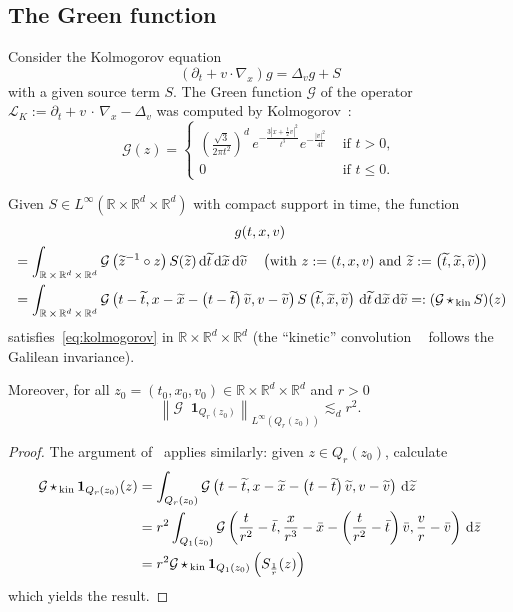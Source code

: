 \documentclass[10pt]{amsart}
\theoremstyle{definition}\newtheorem{defi}[theo]{Definition}\newtheorem{rema}[theo]{Remark}\newtheorem{exam}[theo]{Example}\newtheorem{exem}[theo]{Example}\newtheorem{nota}[theo]{Notation}
\DeclareMathOperator{\starkin}{\star_{\, kin}}
\newcommand{\R}{\mathbb{R}}
\newcommand{\cL}{\mathcal{L}}
\newcommand{\cG}{\mathcal{G}}
\newcommand*\un{\mathbf{1}}
\newcommand{\dd}{{\, \mathrm d}}
\let\oldtilde\tilde
\renewcommand*{\tilde}[1]{\mathchoice{\widetilde{#1}}{\widetilde{#1}}{\oldtilde{#1}}{\oldtilde{#1}}}
\begin{document}
\subsection{The Green function}

Consider the Kolmogorov equation
\begin{equation}\label{eq:kolmogorov}
(\partial_t + v \cdot \nabla_x) g = \Delta_v g + S
\end{equation}
with a given source term $S$. The Green function $\cG$ of the operator $\cL_K:= \partial_t + v\,\cdot\,\nabla_x - \Delta_v$ was computed by Kolmogorov~\cite{kolm}:
\begin{equation}\label{eq:green}
\cG(z) =
\begin{cases}
\left(\frac{\sqrt{3}}{2 \pi t^2}\right)^d\,e^{-\frac{3\left|x+\frac{t}2 v\right|^2}{t^3}} e^{-\frac{|v|^2}{4 t}} & \text{ if } t > 0, \\
0 & \text{ if } t \le 0.
\end{cases}
\end{equation}

\begin{prop}\label{prop:pregreen}
Given $S \in L^\infty(\R \times \R^d \times \R^d)$ with compact support in time, the function
\begin{multline*}
g(t,x,v) \\
\begin{aligned}
&= \int_{\R\,\times\,\R^d\,\times\,\R^d}
\cG\left(\tilde z^{-1} \circ z\right) S(\tilde z) \dd \tilde t \dd
\tilde x \dd \tilde v \quad
 \left(\text{with } z:=(t,x,v) \text{ and } \tilde z := \left(\tilde t,\tilde x,\tilde v\right)\right)\\
& = \int_{\R\,\times\,\R^d\,\times\,\R^d} \cG\left(t-\tilde t,x- \tilde x - \left(t - \tilde t\right)\tilde v,v-\tilde v\right) S \left(\tilde t,\tilde x,\tilde v\right) \dd \tilde t \dd \tilde x \dd \tilde v =: (\cG \starkin S)(z)
\end{aligned}
\end{multline*}
satisfies~\eqref{eq:kolmogorov} in $\R \times \R^d \times \R^d$ (the ``kinetic'' convolution $\starkin$ follows the Galilean invariance).

Moreover, for all $z_0 =(t_0,x_0,v_0) \in \R \times \R^d \times \R^d$ and $r >0$
\[
\left\|\cG \starkin \un_{Q_r(z_0)}\right\|_{L^\infty\left(Q_r(z_0)\right)}
\lesssim_d r^2.
\]
\end{prop}

\begin{proof}
The argument of~\cite[Lemma~8.4.1, p.~115]{krylov1996} applies similarly: given $z \in Q_r(z_0)$, calculate
\begin{align*}
\cG \starkin \un_{Q_r(z_0)}(z) & = \int_{Q_r(z_0)} \cG\left(t-\tilde t,x- \tilde x - \left(t - \tilde t\right)\tilde v,v-\tilde v\right) \dd \tilde z \\
& = r^2 \int_{Q_1(z_0)} \cG\left(\frac{t}{r^2}-\bar t,\frac{x}{r^3}- \bar x - \left(\frac{t}{r^2} - \bar t\right)\bar v,\frac{v}{r}-\bar v\right) \dd \bar z \\
& = r^2 \cG \starkin \un_{Q_1(z_0)}\left(S_\frac1r(z)\right)
\end{align*}
which yields the result.
\end{proof}
\end{document}
